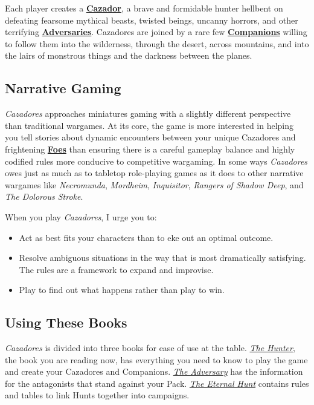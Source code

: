 \documentclass[
]{book}
\providecommand{\tightlist}{%
  \setlength{\itemsep}{0pt}\setlength{\parskip}{0pt}}
\begin{document}
Each player creates a \textbf{\protect\hyperlink{cazadores}{Cazador}}, a brave and formidable hunter hellbent on defeating fearsome mythical beasts, twisted beings, uncanny horrors, and other terrifying \textbf{\protect\hyperlink{foes}{Adversaries}}. Cazadores are joined by a rare few \textbf{\protect\hyperlink{cazadores}{Companions}} willing to follow them into the wilderness, through the desert, across mountains, and into the lairs of monstrous things and the darkness between the planes.

\hypertarget{narrative-gaming}{%
\subsection*{Narrative Gaming}\label{narrative-gaming}}

\emph{Cazadores} approaches miniatures gaming with a slightly different perspective than traditional wargames. At its core, the game is more interested in helping you tell stories about dynamic encounters between your unique Cazadores and frightening \textbf{\protect\hyperlink{foes}{Foes}} than ensuring there is a careful gameplay balance and highly codified rules more conducive to competitive wargaming. In some ways \emph{Cazadores} owes just as much as to tabletop role-playing games as it does to other narrative wargames like \emph{Necromunda}, \emph{Mordheim}, \emph{Inquisitor}, \emph{Rangers of Shadow Deep}, and \emph{The Dolorous Stroke}.

When you play \emph{Cazadores}, I urge you to:

\begin{itemize}
\tightlist
\item
  Act as best fits your characters than to eke out an optimal outcome.
\item
  Resolve ambiguous situations in the way that is most dramatically satisfying. The rules are a framework to expand and improvise.
\item
  Play to find out what happens rather than play to win.
\end{itemize}

\hypertarget{using-these-books}{%
\subsection*{Using These Books}\label{using-these-books}}

\emph{Cazadores} is divided into three books for ease of use at the table. \emph{\protect\hyperlink{hunterintro}{The Hunter}}, the book you are reading now, has everything you need to know to play the game and create your Cazadores and Companions. \emph{\protect\hyperlink{adversaryintro}{The Adversary}} has the information for the antagonists that stand against your Pack. \emph{\protect\hyperlink{eternalintro}{The Eternal Hunt}} contains rules and tables to link Hunts together into campaigns.
\end{document}
